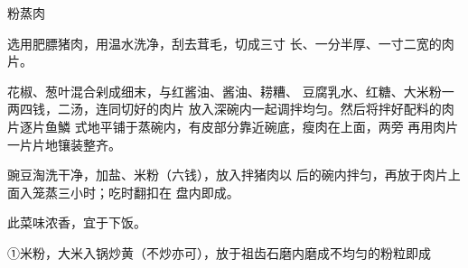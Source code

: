 \begin{recipe}{粉蒸肉}

\ingredients


\cooking

\step 选用肥膘猪肉，用温水洗净，刮去茸毛，切成三寸 长、一分半厚、一寸二宽的肉片。

\step 花椒、葱叶混合剁成细末，与红酱油、酱油、耢糟、 豆腐乳水、红糖、大米粉一两四钱，二汤，连同切好的肉片 放入深碗内一起调拌均匀。然后将拌好配料的肉片逐片鱼鱗 式地平铺于蒸碗内，有皮部分靠近碗底，瘦肉在上面，两旁 再用肉片一片片地镶装整齐。

\step 豌豆淘洗干净，加盐、米粉（六钱），放入拌猪肉以 后的碗内拌匀，再放于肉片上面入笼蒸三小时；吃时翻扣在 盘内即成。

\notes

此菜味浓香，宜于下饭。

①米粉，大米入锅炒黄（不炒亦可），放于祖齿石磨内磨成不均匀的粉粒即成

\end{recipe}

